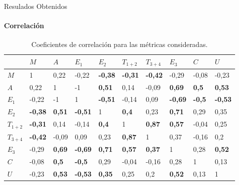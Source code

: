 \begin{frame}{Resulados Obtenidos}
\framesubtitle{Correlaci\'on}
\begin{table}[H] 
\centering
\footnotesize
\begin{tabular}{|p{0.5cm}|p{0.75cm}|p{0.7cm}|p{0.75cm}|p{0.75cm}|p{0.75cm}|p{0.75cm}|p{0.75cm}|p{0.7cm}|p{0.75cm}|}
\hline
& $M$ &  $A$  &   $E_1$ &  $E_2$  &  $T_{1+2}$  & $T_{3+4}$     & $E_3$ & $C$ & $U$ \\
\hline
$M$       &  1     &  0,22  & -0,22  & \textbf{-0,38}  &  \textbf{-0,31}  &  \textbf{-0,42}  &  -0,29 & -0,08    &  -0,23 \\
$A$       &  0,22  &  1  &  -1  &  \textbf{0,51}  &  0,14  &  -0,09  &  \textbf{0,69}  &  \textbf{0,5}           &  \textbf{0,53} \\
$E_1$     &  -0,22 &  -1  &  1  &  \textbf{-0,51}  &  -0,14  &  0,09  &  \textbf{-0,69}  &  \textbf{-0,5}        &  \textbf{-0,53} \\
$E_2$     &  \textbf{-0,38} &  \textbf{0,51}  &  \textbf{-0,51}  &  1  &  \textbf{0,4}  &  0,23  &  \textbf{0,71}  &  0,29         &  0,35  \\
$T_{1+2}$ &  \textbf{-0,31} &  0,14  &  -0,14  &  \textbf{0,4}  &  1  &  \textbf{0,87}  &  \textbf{0,57}  &  -0,04        &  0,25 \\
$T_{3+4}$ &  \textbf{-0,42} &  -0,09  &  0,09  &  0,23  &  \textbf{0,87}  &  1  &  0,37  &  -0,16       &  0,2 \\
$E_3$     &  -0,29 &  \textbf{0,69}  &  \textbf{-0,69}  &  \textbf{0,71}  &  \textbf{0,57}  &  \textbf{0,37}  &  1  &  0,28        &  \textbf{0,52} \\
$C$       &  -0,08 &  \textbf{0,5}  &  \textbf{-0,5}  &  0,29  &  -0,04  &  -0,16  &  0,28  &  1        &  0,13 \\
$U$       &  -0,23 &  \textbf{0,53}  &  \textbf{-0,53}  &  \textbf{0,35}  &  0,25  &  0,2  &  \textbf{0,52}  &  0,13      &  1 \\
\hline
\end{tabular}
\caption{Coeficientes de correlaci\'on para las m\'etricas consideradas.}
\label{sec:tabla-correlacion}
\end{table}

\end{frame}

